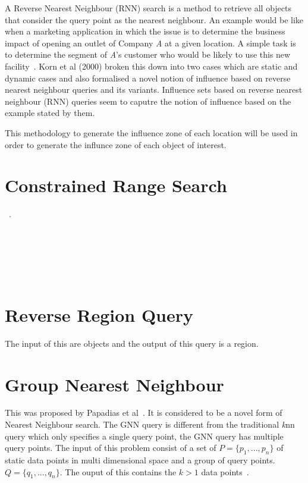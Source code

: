 \documentclass[a4paper,11pt]{article}
\begin{document}
A Reverse Nearest Neighbour (RNN) search is a method to retrieve all objects that consider the query point as the nearest neighbour. An example would be like when a marketing application in which the issue is to determine the business impact of opening an outlet of Company \textit{A} at a given location. A simple task is to determine the segment of \textit{A}'s customer who would be likely to use this new facility~\cite{korn2000influence}. Korn et al (2000) broken this down into two cases which are static and dynamic cases and also formalised a novel notion of influence based on reverse nearest neighbour queries and its variants. Influence sets based on reverse nearest neighbour (RNN) queries seem to caputre the notion of influence based on the example stated by them.



This methodology to generate the influence zone of each location will be used in order to generate the influnce zone of each object of interest. 


\section{Constrained Range Search}

~\cite{xuan2011constrained}.

~\cite{kolahdouzan2004voronoi}

~\cite{zhao2008incremental}

~\cite{hu2006fast}

\section{Reverse Region Query}

The input of this are objects and the output of this query is a region. 

\section{Group Nearest Neighbour} 

This was proposed by Papadias et al~\cite{papadias2004group}. It is considered to be a novel form of Nearest Neighbour search. The GNN query is different from the traditional \textit{k}nn query which only specifies a single query point, the GNN query has multiple query points. The input of this problem consist of  a set of $P=\{p_1,...,p_n\}$ of static data points in multi dimensional space and a group of query points. $Q=\{q_1,...,q_n\}$. The ouput of this contains the $k>1$ data points~\cite{papadias2004group}. 
\end{document}
